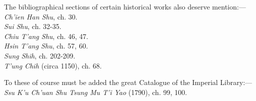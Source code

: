 \documentclass[10pt,a4paper]{book}
\begin{document}
The bibliographical sections of certain historical works also deserve mention:---
\noindent\textit{Ch’ien Han Shu}, ch. 30. \\
\textit{Sui Shu}, ch. 32-35. \\
\textit{Chiu T’ang Shu}, ch. 46, 47. \\
\textit{Hsin T’ang Shu}, ch. 57, 60. \\
\textit{Sung Shih}, ch. 202-209. \\
\textit{T’ung Chih} (circa 1150), ch. 68.

To these of course must be added the great Catalogue of the Imperial Library:--- \\
\indent\textit{Ssu K’u Ch’uan Shu Tsung Mu T’i Yao} (1790), ch. 99, 100.
\end{document}
